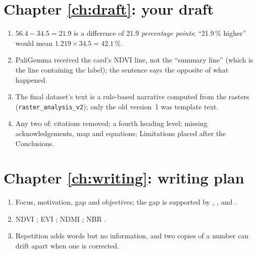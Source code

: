 \section*{Chapter \ref{ch:draft}: your draft}
\begin{enumerate}
  \item $56.4 - 34.5 = 21.9$ is a difference of 21.9 \emph{percentage points}; ``21.9\,\% higher'' would mean $1.219 \times 34.5 = 42.1\,\%$.
  \item PaliGemma received the card's NDVI line, not the ``summary line'' (which is the line containing the label); the sentence says the opposite of what happened.
  \item The final dataset's text is a rule-based narrative computed from the rasters (\texttt{raster\_analysis\_v2}); only the old version~1 was template text.
  \item Any two of: citations removed; a fourth heading level; missing acknowledgements, map and equations; Limitations placed after the Conclusions.
\end{enumerate}

\section*{Chapter \ref{ch:writing}: writing plan}
\begin{enumerate}
  \item Focus, motivation, gap and objectives; the gap is supported by \citet{jacovi2020}, \citet{turpin2023}, \citet{li2023pope} and \citet{zhao2021calibrate}.
  \item NDVI \citet{rouse1974,tucker1979}; EVI \citet{huete2002}; NDMI \citet{gao1996}; NBR \citet{keybenson2006}.
  \item Repetition adds words but no information, and two copies of a number can drift apart when one is corrected.
\end{enumerate}
